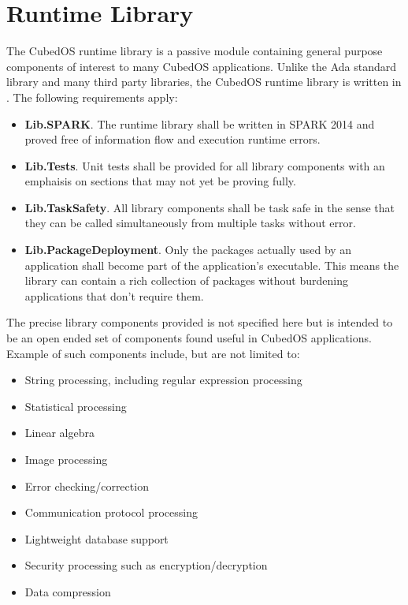 \section{Runtime Library}
\label{sec:runtime-library}

The CubedOS runtime library is a passive module containing general purpose components of
interest to many CubedOS applications. Unlike the Ada standard library and many third party
libraries, the CubedOS runtime library is written in \SPARK. The following requirements apply:

\begin{itemize}
\item \textbf{Lib.SPARK}. The runtime library shall be written in SPARK 2014 and proved free of
  information flow and execution runtime errors.
\item \textbf{Lib.Tests}. Unit tests shall be provided for all library components with an
  emphaisis on sections that may not yet be proving fully.
\item \textbf{Lib.TaskSafety}. All library components shall be task safe in the sense that they
  can be called simultaneously from multiple tasks without error.
\item \textbf{Lib.PackageDeployment}. Only the packages actually used by an application shall
  become part of the application's executable. This means the library can contain a rich
  collection of packages without burdening applications that don't require them.
\end{itemize}

The precise library components provided is not specified here but is intended to be an open
ended set of components found useful in CubedOS applications. Example of such components
include, but are not limited to:

\begin{itemize}
\item String processing, including regular expression processing
\item Statistical processing
\item Linear algebra
\item Image processing
\item Error checking/correction
\item Communication protocol processing
\item Lightweight database support
\item Security processing such as encryption/decryption
\item Data compression
\end{itemize}

